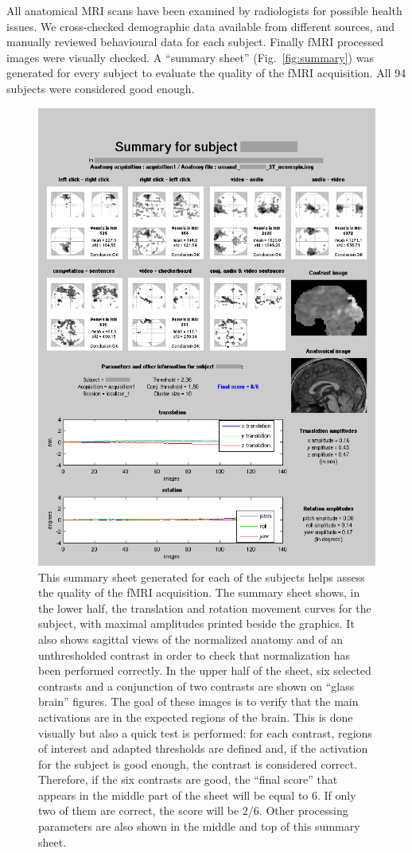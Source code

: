 \documentclass[review]{elsarticle}
\begin{document}
All anatomical MRI scans have been examined by radiologists for possible health issues. We cross-checked demographic data available from different sources, and manually reviewed behavioural data for each subject. Finally fMRI processed images were visually checked. A ``summary sheet'' (Fig.~\ref{fig:summary}) was generated for every subject to evaluate the quality of the fMRI acquisition. All 94 subjects were considered good enough.

\begin{figure}[ht!]
    \centering
    \includegraphics[scale=0.4]{summary}
    \caption{This summary sheet generated for each of the subjects helps assess the quality of the fMRI acquisition. The summary sheet shows, in the lower half, the translation and rotation movement curves for the subject, with maximal amplitudes printed beside the graphics. It also shows sagittal views of the normalized anatomy and of an unthresholded contrast in order to check that normalization has been performed correctly. In the upper half of the sheet, six selected contrasts and a conjunction of two contrasts are shown on ``glass brain'' figures. The goal of these images is to verify that the main activations are in the expected regions of the brain. This is done visually but also a quick test is performed: for each contrast, regions of interest and adapted thresholds are defined and, if the activation for the subject is good enough, the contrast is considered correct. Therefore, if the six contrasts are good, the ``final score'' that appears in the middle part of the sheet will be equal to 6. If only two of them are correct, the score will be 2/6. Other processing parameters are also shown in the middle and top of this summary sheet.}

\end{figure}
\end{document}
